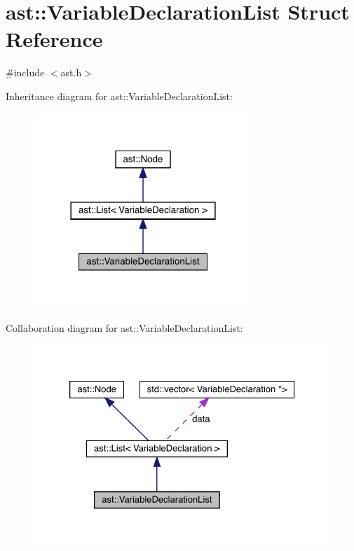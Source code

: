 \hypertarget{structast_1_1_variable_declaration_list}{}\section{ast\+:\+:Variable\+Declaration\+List Struct Reference}
\label{structast_1_1_variable_declaration_list}


{\ttfamily \#include $<$ast.\+h$>$}



Inheritance diagram for ast\+:\+:Variable\+Declaration\+List\+:\nopagebreak
\begin{figure}[H]
\begin{center}
\leavevmode
\includegraphics[width=234pt]{structast_1_1_variable_declaration_list__inherit__graph}
\end{center}
\end{figure}


Collaboration diagram for ast\+:\+:Variable\+Declaration\+List\+:\nopagebreak
\begin{figure}[H]
\begin{center}
\leavevmode
\includegraphics[width=326pt]{structast_1_1_variable_declaration_list__coll__graph}
\end{center}
\end{figure}
